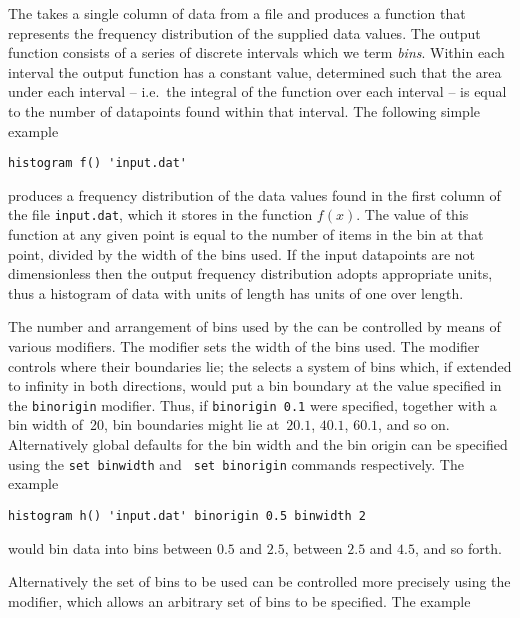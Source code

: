 The  takes a single column of data from a file and produces
a function that represents the frequency distribution of the supplied data
values. The output function consists of a series of discrete intervals which we
term {\it bins}. Within each interval the output function has a constant value,
determined such that the area under each interval -- i.e.\ the integral of the
function over each interval -- is equal to the number of datapoints found
within that interval.  The following simple example

\begin{verbatim}
histogram f() 'input.dat'
\end{verbatim}

\noindent produces a frequency distribution of the data values found in the
first column of the file {\tt input.dat}, which it stores in the function
$f(x)$. The value of this function at any given point is equal to the number of
items in the bin at that point, divided by the width of the bins used. If the
input datapoints are not dimensionless then the output frequency distribution
adopts appropriate units, thus a histogram of data with units of length has
units of one over length.

The number and arrangement of bins used by the  can be
controlled by means of various modifiers.  The  modifier sets
the width of the bins used. The  modifier controls where
their boundaries lie; the  selects a system of bins which,
if extended to infinity in both directions, would put a bin boundary at the
value specified in the {\tt binorigin} modifier. Thus, if {\tt binorigin 0.1}
were specified, together with a bin width of~20, bin boundaries might lie
at~$20.1$, $40.1$, $60.1$, and so on. Alternatively global defaults for the bin
width and the bin origin can be specified using the {\tt set binwidth} and {\tt
set binorigin} commands respectively. The example

\begin{verbatim}
histogram h() 'input.dat' binorigin 0.5 binwidth 2
\end{verbatim}

\noindent would bin data into bins between $0.5$ and $2.5$, between $2.5$ and
$4.5$, and so forth.

Alternatively the set of bins to be used can be controlled more precisely using
the  modifier, which allows an arbitrary set of bins to be
specified. The example

